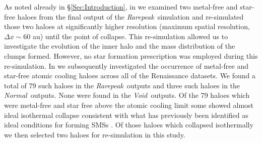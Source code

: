 \documentclass[graphics, twocolumn, usenatbib]{mn2e}
\newcommand{\rarepeak} {\textit{Rarepeak~}}
\newcommand{\normal} {\textit{Normal~}}
\newcommand{\void} {\textit{Void~}}
\begin{document}
\indent  As noted already in \S \ref{Sec:Introduction}, in \cite{Wise_2019} we examined two metal-free and star-free
 haloes from the final output of the \rarepeak simulation and re-simulated those two haloes at
 significantly higher resolution (maximum spatial resolution, $\Delta x \sim 60$ au) until the
 point of collapse. This re-simulation allowed us to investigate the evolution of the inner halo
 and the mass distribution of the clumps formed. However, no star formation prescription was
 employed during this re-simulation. In \cite{Regan_2020} we subsequently investigated the occurrence
 of metal-free and star-free atomic cooling haloes across all of the Renaissance datasets. We found
 a total of 79 such haloes in the
 \rarepeak outputs and three such haloes in the \normal outputs. None were found in the \void outputs.
 Of the 79 haloes which were metal-free and star free above the atomic cooling limit some
 showed almost ideal isothermal collapse consistent with what has previously been identified
 as ideal conditions for forming SMSs \citep{Inayoshi_2014, Becerra_2015, Latif_2016a,
   Regan_2017, Chon_2017b, Regan_2018b}. Of those haloes which collapsed isothermally we then
 selected two haloes for re-simulation in this study. \\
\end{document}
